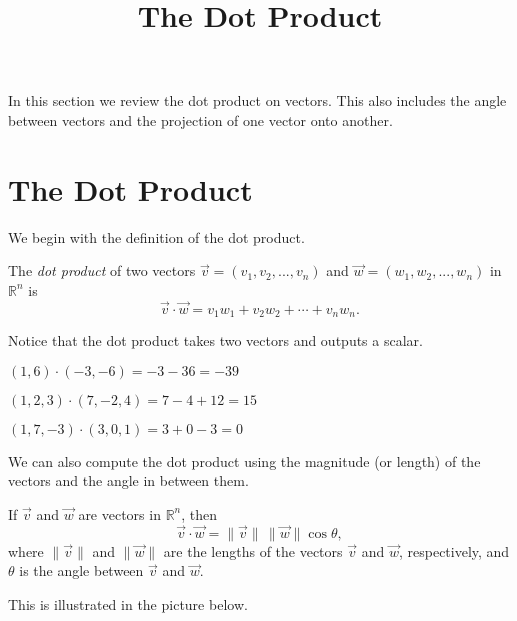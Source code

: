 \documentclass{ximera}
\title{The Dot Product}
\begin{document}
  
\begin{abstract}  
\end{abstract}  
\maketitle 

In this section we review the dot product on vectors. This also includes the angle between vectors and the projection of one vector onto another.

\section*{The Dot Product}

We begin with the definition of the dot product.

\begin{definition}
The \emph{dot product} of two vectors $\vec{v} = (v_1,v_2,...,v_n)$ and $\vec{w} = (w_1,w_2,...,w_n)$ in $\mathbb{R}^n$ is
\[
\vec{v}\cdot\vec{w} = v_1w_1+v_2w_2+\cdots + v_nw_n.
\]
\end{definition}

Notice that the dot product takes two vectors and outputs a scalar.

\begin{example}
$(1,6)\cdot (-3,-6) = -3-36=-39$

$(1,2,3)\cdot (7,-2,4) = 7-4+12=15$

$(1,7,-3)\cdot (3,0,1) = 3+0-3=0$
\end{example}

We can also compute the dot product using the magnitude (or length) of the vectors and the angle in between them.

\begin{proposition}
If $\vec{v}$ and $\vec{w}$ are vectors in $\mathbb{R}^n$, then
\[
\vec{v}\cdot\vec{w} = \|\vec{v}\|\,\|\vec{w}\|\cos\theta,
\]
where $\|\vec{v}\|$ and $\|\vec{w}\|$ are the lengths of the vectors $\vec{v}$ and $\vec{w}$, respectively, and $\theta$ is the angle between $\vec{v}$ and $\vec{w}$.
\end{proposition}

This is illustrated in the picture below.

\begin{image}
\end{image}
\end{document}
